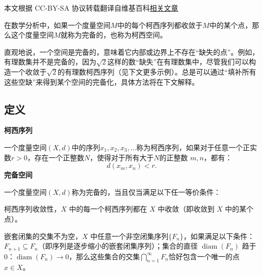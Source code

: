 
本文根据 CC-BY-SA 协议转载翻译自维基百科\href{https://en.wikipedia.org/wiki/Complete_metric_space}{相关文章}

在数学分析中，如果一个度量空间$M$中的每个柯西序列都收敛于$M$中的某个点，那么这个度量空间$M$就称为完备的，也称为柯西空间。

直观地说，一个空间是完备的，意味着它内部或边界上不存在“缺失的点”。例如，有理数集并不是完备的，因为$\sqrt{2}$这样的数“缺失”在有理数集中，尽管我们可以构造一个收敛于$\sqrt{2}$的有理数柯西序列（见下文更多示例）。总是可以通过“填补所有这些空缺”来得到某个空间的完备化，具体方法将在下文解释。
\subsection{定义}
\textbf{柯西序列}

一个度量空间$(X, d)$中的序列$x_{1}, x_{2}, x_{3}, \ldots$称为柯西序列，如果对于任意一个正实数$r > 0$，存在一个正整数$N$，使得对于所有大于$N$的正整数 $m, n$，都有：
$$
d(x_{m}, x_{n}) < r.
$$
\textbf{完备空间}

一个度量空间$(X, d)$称为完备的，当且仅当满足以下任一等价条件：

柯西序列收敛性，$X$ 中的每一个柯西序列都在 $X$ 中收敛（即收敛到 $X$ 中的某个点）。

嵌套闭集的交集不为空，$X$ 中任意一个非空闭集序列$\{F_n\}$，如果满足以下条件：$F_{n+1} \subseteq F_n$（即序列是逐步缩小的嵌套闭集序列）；集合的直径 $\operatorname{diam}(F_n)$ 趋于 0：$\operatorname{diam}(F_n) \to 0$，那么这些集合的交集$\bigcap_{n=1}^{\infty} F_n$恰好包含一个唯一的点 $x \in X$。
